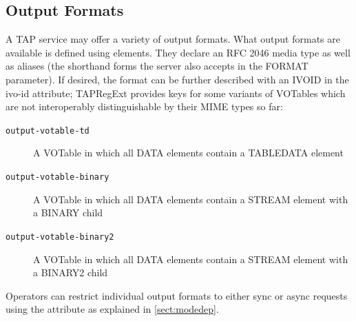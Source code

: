 \documentclass{ivoa}
\begin{document}

\subsection{Output Formats}

\label{outforms}

A TAP service may offer a variety of output formats.
What output formats are available is defined using
 elements.   They
declare an RFC 2046 media type \citep{std:MIME} as well
as aliases (the shorthand forms the server also accepts in the
FORMAT parameter).  If desired, the format can be further described with an
IVOID in the ivo-id attribute; TAPRegExt provides keys for some variants of
VOTables which are not interoperably distinguishable by their MIME types so far:


\begin{description}
\item[\normalfont\texttt{output-votable-td}]A VOTable in which all DATA elements contain a TABLEDATA element
\item[\normalfont\texttt{output-votable-binary}]A VOTable in which all DATA elements contain a STREAM element
	with a BINARY child
\item[\normalfont\texttt{output-votable-binary2}]A VOTable in which all DATA elements contain a STREAM element
	with a BINARY2 child
\end{description}

Operators can restrict individual output formats to either sync or async
requests using the  attribute as explained in
\ref{sect:modedep}.
\end{document}
